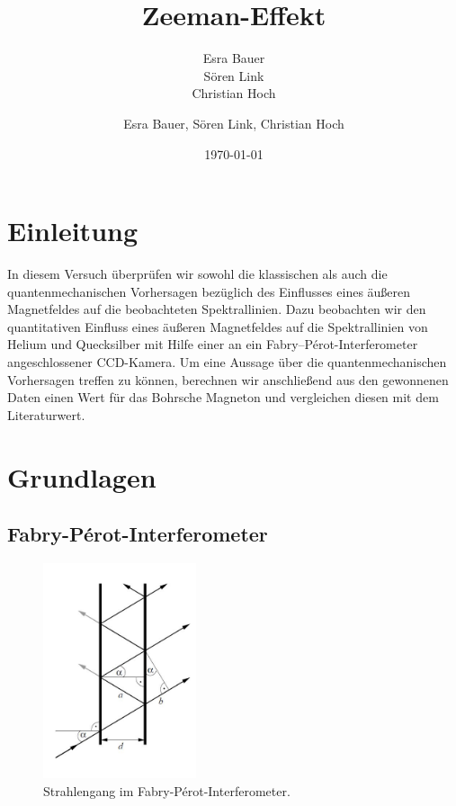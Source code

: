 \documentclass[bigchapter,colorback,accentcolor=tud4b,linedtoc,11pt]{tudreport}
\title{Zeeman-Effekt}
\subtitle{Esra Bauer  \\Sören Link \\Christian Hoch}
\author{Esra Bauer, Sören Link, Christian Hoch}
\date{\today}
\begin{document}

\maketitle

\tableofcontents

\chapter{Einleitung}

In diesem Versuch überprüfen wir sowohl die klassischen als auch die
quantenmechanischen Vorhersagen bezüglich des Einflusses eines äußeren
Magnetfeldes auf die beobachteten Spektrallinien. Dazu beobachten wir den
quantitativen Einfluss eines äußeren Magnetfeldes auf die Spektrallinien von
Helium und Quecksilber mit Hilfe einer an ein Fabry–Pérot-Interferometer
angeschlossener CCD-Kamera. Um eine Aussage über die quantenmechanischen
Vorhersagen treffen zu können, berechnen wir anschließend aus den gewonnenen
Daten einen Wert für das Bohrsche Magneton und vergleichen diesen mit dem
Literaturwert.

\chapter{Grundlagen}


\section{Fabry-Pérot-Interferometer}

\begin{figure}[H] 
  \centering
     \includegraphics[width=0.4\textwidth]{data/Fabry.jpg}
  \caption{Strahlengang im Fabry-Pérot-Interferometer.}
  \label{fig:Bild1}
\end{figure}
\end{document}
